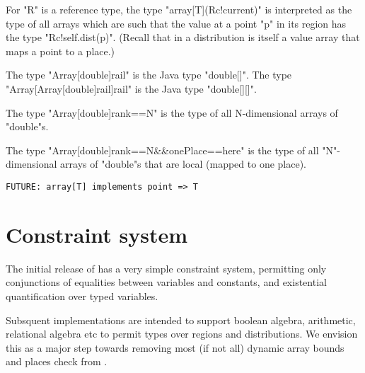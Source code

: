 For \xcd"R" is a reference type, the type \xcd"array[T](R{c}!current)" is interpreted as the
type of all arrays which are such that the value at a point \xcd"p" in its
region has the type \xcd"R{c}!self.dist(p)". (Recall that in \Xten{} a
distribution is itself a value array that maps a point to a place.)

\begin{example}
  The type \xcd"Array[double]{rail}" is the Java type \xcd"double[]".
  The type \xcd"Array[Array[double]{rail}]{rail}" is the Java type \xcd"double[][]".

  The type \xcd"Array[double]{rank==N}" is the type of all N-dimensional arrays of
  \xcd"double"s.

  The type \xcd"Array[double]{rank==N&&onePlace==here}" is the
  type of all \xcd"N"-dimensional
  arrays of \xcd"double"s that are local (mapped to one place).  
\end{example}

\begin{verbatim}
FUTURE: array[T] implements point => T
\end{verbatim}

\section{Constraint system}

The initial release of \Xten{} has a very simple constraint system,
permitting only conjunctions of equalities between variables and
constants, and existential quantification over typed variables.

Subsquent implementations are intended to support boolean algebra,
arithmetic, relational algebra etc to permit types over regions and
distributions. We envision this as a major step towards removing most
(if not all) dynamic array bounds and places check from \Xten{}.
  
